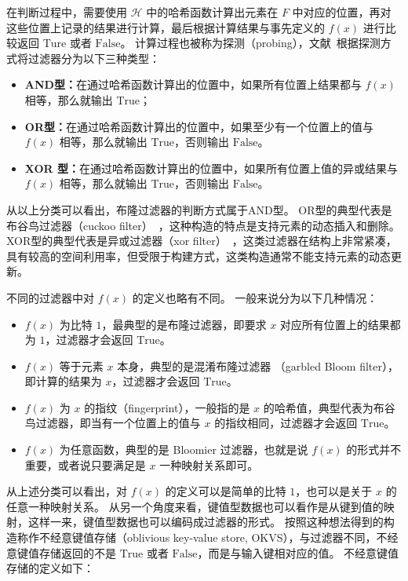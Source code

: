 在判断过程中，需要使用 $\mathcal{H}$ 中的哈希函数计算出元素在 $F$ 中对应的位置，再对这些位置上记录的结果进行计算，最后根据计算结果与事先定义的 $f(x)$ 进行比较返回 $\mbox{Ture}$ 或者 $\mbox{False}$。
计算过程也被称为探测（probing），文献~\cite{dillinger2021ribbon}根据探测方式将过滤器分为以下三种类型：
\begin{itemize}
    \item \textbf{AND型：}在通过哈希函数计算出的位置中，如果所有位置上结果都与 $f(x)$ 相等，那么就输出 $\mbox{True}$；
    \item \textbf{OR型：}在通过哈希函数计算出的位置中，如果至少有一个位置上的值与 $f(x)$ 相等，那么就输出 $\mbox{True}$，否则输出 $\mbox{False}$。
    \item \textbf{XOR 型：}在通过哈希函数计算出的位置中，如果所有位置上值的异或结果与 $f(x)$ 相等，那么就输出 $\mbox{True}$，否则输出 $\mbox{False}$。
\end{itemize}
从以上分类可以看出，布隆过滤器的判断方式属于AND型。
OR型的典型代表是布谷鸟过滤器（cuckoo filter）~\cite{fan2014cuckoo}，这种构造的特点是支持元素的动态插入和删除。
XOR型的典型代表是异或过滤器（xor filter）~\cite{fan2014cuckoo}，这类过滤器在结构上非常紧凑，具有较高的空间利用率，但受限于构建方式，这类构造通常不能支持元素的动态更新。

不同的过滤器中对 $f(x)$ 的定义也略有不同。
一般来说分为以下几种情况：
\begin{itemize}
    \item $f(x)$ 为比特 $1$，最典型的是布隆过滤器，即要求 $x$ 对应所有位置上的结果都为 $1$，过滤器才会返回 $\mbox{True}$。
    \item $f(x)$ 等于元素 $x$ 本身，典型的是混淆布隆过滤器 （garbled Bloom filter），即计算的结果为 $x$，过滤器才会返回 $\mbox{True}$。
    \item $f(x)$ 为 $x$ 的指纹（fingerprint），一般指的是 $x$ 的哈希值，典型代表为布谷鸟过滤器，即当有一个位置上的值与 $x$ 的指纹相同，过滤器才会返回 $\mbox{True}$。
    \item $f(x)$ 为任意函数，典型的是 Bloomier 过滤器，也就是说 $f(x)$ 的形式并不重要，或者说只要满足是 $x$ 一种映射关系即可。
\end{itemize}

从上述分类可以看出，对 $f(x)$ 的定义可以是简单的比特 $1$，也可以是关于 $x$ 的任意一种映射关系。
从另一个角度来看，键值型数据也可以看作是从键到值的映射，这样一来，键值型数据也可以编码成过滤器的形式。
按照这种想法得到的构造称作不经意键值存储（oblivious key-value store, OKVS），与过滤器不同，不经意键值存储返回的不是 $\mbox{True}$ 或者 $\mbox{False}$，而是与输入键相对应的值。
不经意键值存储的定义如下：

